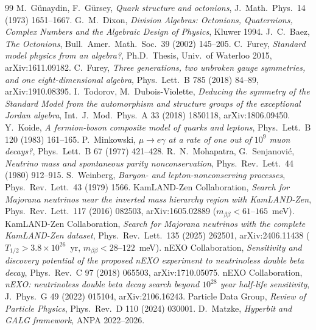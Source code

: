 \begin{thebibliography}{99}
 M.~Günaydin, F.~Gürsey, \textit{Quark structure and octonions},
J.~Math.\ Phys.\ 14 (1973) 1651--1667.
 G.~M.~Dixon, \textit{Division Algebras: Octonions, Quaternions,
Complex Numbers and the Algebraic Design of Physics}, Kluwer 1994.
 J.~C.~Baez, \textit{The Octonions}, Bull.\ Amer.\ Math.\ Soc.\ 39 (2002) 145--205.
 C.~Furey, \textit{Standard model physics from an algebra?},
Ph.D.\ Thesis, Univ.\ of Waterloo 2015, arXiv:1611.09182.
 C.~Furey, \textit{Three generations, two unbroken gauge
symmetries, and one eight-dimensional algebra}, Phys.\ Lett.\ B 785 (2018) 84--89, arXiv:1910.08395.
 I.~Todorov, M.~Dubois-Violette, \textit{Deducing the
symmetry of the Standard Model from the automorphism and structure groups of
the exceptional Jordan algebra}, Int.\ J.\ Mod.\ Phys.\ A 33 (2018) 1850118, arXiv:1806.09450.
 Y.~Koide, \textit{A fermion-boson composite model of quarks
and leptons}, Phys.\ Lett.\ B 120 (1983) 161--165.
 P.~Minkowski, \textit{$\mu\to e\gamma$ at a rate of one
out of $10^9$ muon decays?}, Phys.\ Lett.\ B 67 (1977) 421--428.
 R.~N.~Mohapatra, G.~Senjanović, \textit{Neutrino mass
and spontaneous parity nonconservation}, Phys.\ Rev.\ Lett.\ 44 (1980) 912--915.
 S.~Weinberg, \textit{Baryon- and lepton-nonconserving
processes}, Phys.\ Rev.\ Lett.\ 43 (1979) 1566.
 KamLAND-Zen Collaboration, \textit{Search for Majorana
neutrinos near the inverted mass hierarchy region with KamLAND-Zen},
Phys.\ Rev.\ Lett.\ 117 (2016) 082503, arXiv:1605.02889 ($m_{\beta\beta}<61$--$165$~meV).
 KamLAND-Zen Collaboration, \textit{Search for Majorana
neutrinos with the complete KamLAND-Zen dataset}, Phys.\ Rev.\ Lett.\ 135 (2025) 262501,
arXiv:2406.11438 ($T_{1/2}>3.8\times10^{26}$~yr, $m_{\beta\beta}<28$--$122$~meV).
 nEXO Collaboration, \textit{Sensitivity and discovery potential
of the proposed nEXO experiment to neutrinoless double beta decay}, Phys.\ Rev.\ C 97 (2018) 065503, arXiv:1710.05075.
 nEXO Collaboration, \textit{nEXO: neutrinoless double beta decay search
beyond $10^{28}$ year half-life sensitivity}, J.~Phys.\ G 49 (2022) 015104, arXiv:2106.16243.
 Particle Data Group, \textit{Review of Particle Physics},
Phys.\ Rev.\ D 110 (2024) 030001.
 D.~Matzke, \textit{Hyperbit and GALG framework}, ANPA 2022--2026.

\end{thebibliography}
